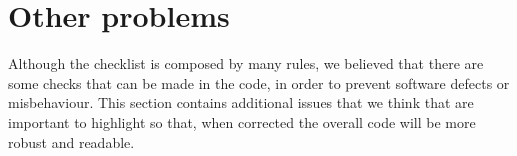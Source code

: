 \newpage
\section{Other problems}
Although the checklist is composed by many rules, we believed that there are some checks that can be made in the code, in order to prevent software defects or misbehaviour. This section contains additional issues that we think that are important to highlight so that, when corrected the overall code will be more robust and readable.